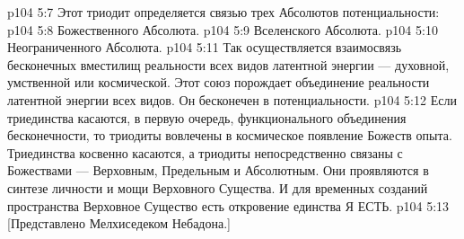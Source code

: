 \vs p104 5:7 \pc {} Этот триодит определяется связью трех Абсолютов потенциальности:
\vs p104 5:8 \bibnobreakspace Божественного Абсолюта.
\vs p104 5:9 \bibnobreakspace Вселенского Абсолюта.
\vs p104 5:10 \bibnobreakspace Неограниченного Абсолюта.
\vs p104 5:11 \pc Так осуществляется взаимосвязь бесконечных вместилищ реальности всех видов латентной энергии --- духовной, умственной или космической. Этот союз порождает объединение реальности латентной энергии всех видов. Он бесконечен в потенциальности.
\vs p104 5:12 \pc Если триединства касаются, в первую очередь, функционального объединения бесконечности, то триодиты вовлечены в космическое появление Божеств опыта. Триединства косвенно касаются, а триодиты непосредственно связаны с Божествами --- Верховным, Предельным и Абсолютным. Они проявляются в синтезе личности и мощи Верховного Существа. И для временных созданий пространства Верховное Существо есть откровение единства Я ЕСТЬ.
\vsetoff
\vs p104 5:13 [Представлено Мелхиседеком Небадона.]
